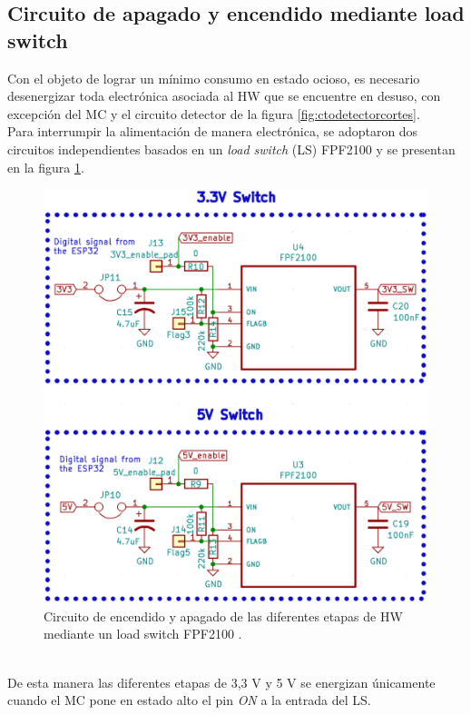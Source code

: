  \subsection{Circuito de apagado y encendido mediante load switch}
 Con el objeto de lograr un mínimo consumo en estado ocioso, es necesario desenergizar toda electrónica asociada al HW que se encuentre en desuso, con excepción del MC y el circuito detector de la figura \ref{fig:ctodetectorcortes}.\\
 Para interrumpir la alimentación de manera electrónica, se adoptaron dos circuitos independientes basados en un \textit{load switch} (LS) FPF2100 y se presentan en la figura \ref{fig:ctoloadswitch}.
 \begin{figure}[h]
 	\centering
 	\includegraphics[width=0.7\linewidth]{Figures/cto_load_switch}
 	\caption{Circuito de encendido y apagado de las diferentes etapas de HW mediante un load switch FPF2100 \citep{fpf2100}.}
 	\label{fig:ctoloadswitch}
 \end{figure}\\
De esta manera las diferentes etapas de 3,3 V y 5 V se energizan únicamente cuando el MC pone en estado alto el pin \textit{ON} a la entrada del LS.\\
 
